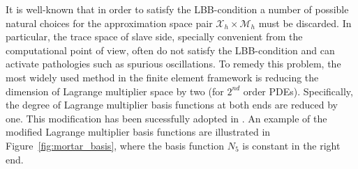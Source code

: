 \documentclass[preprint,12pt]{elsarticle}
\begin{document}
It is well-known that in order to satisfy the LBB-condition a number of possible natural choices for the approximation space pair $\mathcal{X}_h\times{}\mathcal{M}_h$ must be discarded. In particular, the trace space of slave side, specially convenient from the computational point of view, often do not satisfy the LBB-condition and can activate pathologies such as spurious oscillations. To remedy this problem, the most widely used method in the finite element framework is reducing the dimension of Lagrange multiplier space by two (for $2^{nd}$ order PDEs). Specifically, the degree of Lagrange multiplier basis functions at both ends are reduced by one. This modification has been sucessfully adopted in \cite{bernardi_basics_2005, bernardi_domain_1993, belgacem_mortar_1998, belhachmi_resolution_1994, belgacem_mortar_1999, marcinkowski1999mortar, lamichhanehigher, belgacem1999extension}. An example of the modified Lagrange multiplier basis functions are illustrated in Figure~\ref{fig:mortar_basis}, where the basis function $N_5$ is constant in the right end.\par
\end{document}
